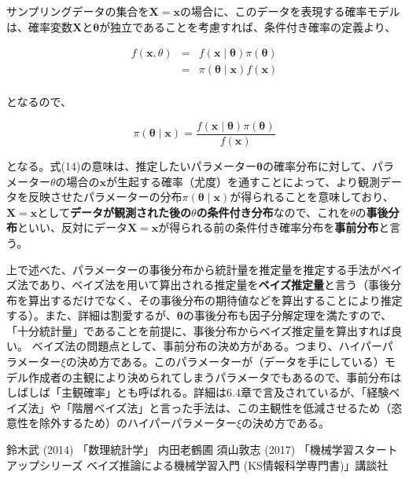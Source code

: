 \documentclass[a4paper,uplatex]{jsarticle}
\begin{document}
サンプリングデータの集合を$\bm{X} = \bm{x}$の場合に、このデータを表現する確率モデルは、確率変数$\bm{X}$と$\bm{\theta}$が独立であることを考慮すれば、条件付き確率の定義より、

\begin{eqnarray*}
  f(\bm{x}, \theta) &=& f(\bm{x} \mid \bm{\theta})\pi(\bm{\theta}) \\
  &=& \pi(\bm{\theta} \mid \bm{x})f(\bm{x}) \\
\end{eqnarray*}

となるので、

\begin{equation}
  \pi(\bm{\theta} \mid \bm{x}) = \frac{f(\bm{x} \mid \bm{\theta})\pi(\bm{\theta})}{f(\bm{x})}
\end{equation}

となる。式(14)の意味は、推定したいパラメーター$\bm{\theta}$の確率分布に対して、パラメーター$\theta$の場合の$\bm{x}$が生起する確率（尤度）を通すことによって、より観測データを反映させたパラメーターの分布$\pi(\bm{\theta} \mid \bm{x})$が得られることを意味しており、$\bm{X}=\bm{x}$として\textbf{データが観測された後の$\theta$の条件付き分布}なので、これを$\theta$の\textbf{事後分布}といい、反対にデータ$\bm{X}=\bm{x}$が得られる前の条件付き確率分布を\textbf{事前分布}と言う。

上で述べた、パラメーターの事後分布から統計量を推定量を推定する手法がベイズ法であり、ベイズ法を用いて算出される推定量を\textbf{ベイズ推定量}と言う（事後分布を算出するだけでなく、その事後分布の期待値などを算出することにより推定する）。また、詳細は割愛するが、$\bm{\theta}$の事後分布も因子分解定理を満たすので、「十分統計量」であることを前提に、事後分布からベイズ推定量を算出すれば良い。
ベイズ法の問題点として、事前分布の決め方がある。つまり、ハイパーパラメーター$\xi$の決め方である。このパラメーターが（データを手にしている）モデル作成者の主観により決められてしまうパラメータでもあるので、事前分布はしばしば「主観確率」とも呼ばれる。詳細は6.4章で言及されているが、「経験ベイズ法」や「階層ベイズ法」と言った手法は、この主観性を低減させるため（恣意性を除外するため）のハイパーパラメーター$\xi$の決め方である。










\begin{thebibliography}{99}
   鈴木武 (2014) 「数理統計学」 内田老鶴圃
   須山敦志 (2017) 「機械学習スタートアップシリーズ ベイズ推論による機械学習入門 (KS情報科学専門書)」講談社
\end{thebibliography}
\end{document}
